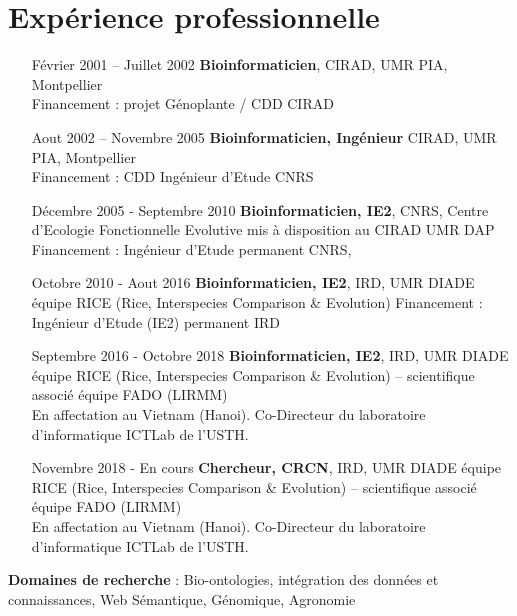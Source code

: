 \section{Expérience professionnelle}
\begin{itemize}
\item[Février 2001 – Juillet 2002 ]  \textbf{Bioinformaticien}, CIRAD, UMR PIA, Montpellier \\
Financement : projet Génoplante / CDD CIRAD	
\item[Aout 2002 – Novembre 2005]  \textbf{Bioinformaticien, Ingénieur} CIRAD, UMR PIA, Montpellier \\
Financement : CDD Ingénieur d’Etude CNRS 
\item[Décembre 2005 - Septembre 2010]  \textbf{Bioinformaticien, IE2}, CNRS, Centre d’Ecologie Fonctionnelle Evolutive mis à disposition au CIRAD UMR DAP \\
Financement : Ingénieur d’Etude permanent CNRS, 
\item[Octobre 2010 - Aout 2016]  \textbf{Bioinformaticien, IE2}, IRD, UMR DIADE équipe RICE (Rice, Interspecies Comparison \& Evolution)
Financement : Ingénieur d’Etude (IE2) permanent IRD
\item[Septembre 2016 - Octobre 2018]  \textbf{Bioinformaticien, IE2}, IRD, UMR DIADE équipe RICE (Rice, Interspecies Comparison \& Evolution) – scientifique associé équipe FADO (LIRMM)\\
En affectation au Vietnam (Hanoi). Co-Directeur du laboratoire d’informatique ICTLab de l’USTH.
\item[Novembre 2018 - En cours]  \textbf{Chercheur, CRCN}, IRD, UMR DIADE équipe RICE (Rice, Interspecies Comparison \& Evolution) – scientifique associé équipe FADO (LIRMM)\\
En affectation au Vietnam (Hanoi). Co-Directeur du laboratoire d’informatique ICTLab de l’USTH.

\end{itemize}

\vspace{1cm}
\textbf{Domaines de recherche} : 	Bio-ontologies, intégration des données et connaissances, Web Sémantique, Génomique, Agronomie

